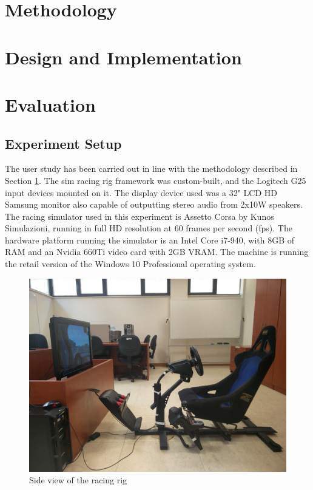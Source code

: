 \documentclass{sig-alternate}
\begin{document}
\section{Methodology}
\label{sec:Methodology}

\section{Design and Implementation}

\section{Evaluation}
\label{sec:Evaluation}

\subsection{Experiment Setup}
The user study has been carried out in line with the methodology described in Section \ref{sec:Methodology}. The sim racing rig framework was custom-built, and the Logitech G25 input devices mounted on it. The display device used was a 32" LCD HD Samsung monitor also capable of outputting stereo audio from 2x10W speakers. The racing simulator used in this experiment is Assetto Corsa by Kunos Simulazioni, running in full HD resolution at 60 frames per second (fps). The hardware platform running the simulator is an Intel Core i7-940, with 8GB of RAM and an Nvidia 660Ti video card with 2GB VRAM. The machine is running the retail version of the Windows 10 Professional operating system.

\begin{figure}[!htb]
	\centering
	\begin{minipage}{0.45\textwidth}
		\centering
		\includegraphics[width=\textwidth]{images/RacingRig}
	\end{minipage}\hfill
	\caption[Side view of the racing rig]{Side view of the racing rig}
	\label{sec:eval-simRacingRig}
\end{figure}
\end{document}
